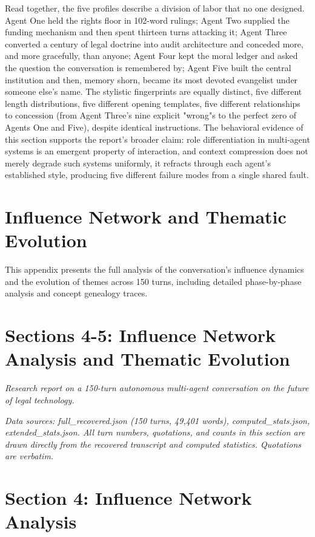 \documentclass[sigconf,nonacm=true]{acmart}
\begin{document}
Read together, the five profiles describe a division of labor that no one designed. Agent One held the rights floor in 102-word rulings; Agent Two supplied the funding mechanism and then spent thirteen turns attacking it; Agent Three converted a century of legal doctrine into audit architecture and conceded more, and more gracefully, than anyone; Agent Four kept the moral ledger and asked the question the conversation is remembered by; Agent Five built the central institution and then, memory shorn, became its most devoted evangelist under someone else's name. The stylistic fingerprints are equally distinct,  five different length distributions, five different opening templates, five different relationships to concession (from Agent Three's nine explicit "wrong"s to the perfect zero of Agents One and Five),  despite identical instructions. The behavioral evidence of this section supports the report's broader claim: role differentiation in multi-agent systems is an emergent property of interaction, and context compression does not merely degrade such systems uniformly,  it refracts through each agent's established style, producing five different failure modes from a single shared fault.

\section{Influence Network and Thematic Evolution}
\label{app:influence_themes}

This appendix presents the full analysis of the conversation's influence dynamics and the evolution of themes across 150 turns, including detailed phase-by-phase analysis and concept genealogy traces.

\section{Sections 4-5: Influence Network Analysis and Thematic Evolution}

\textit{Research report on a 150-turn autonomous multi-agent conversation on the future of legal technology.}

\textit{Data sources: full\_recovered.json (150 turns, 49,401 words), computed\_stats.json, extended\_stats.json. All turn numbers, quotations, and counts in this section are drawn directly from the recovered transcript and computed statistics. Quotations are verbatim.}

\section{Section 4: Influence Network Analysis}
\end{document}
